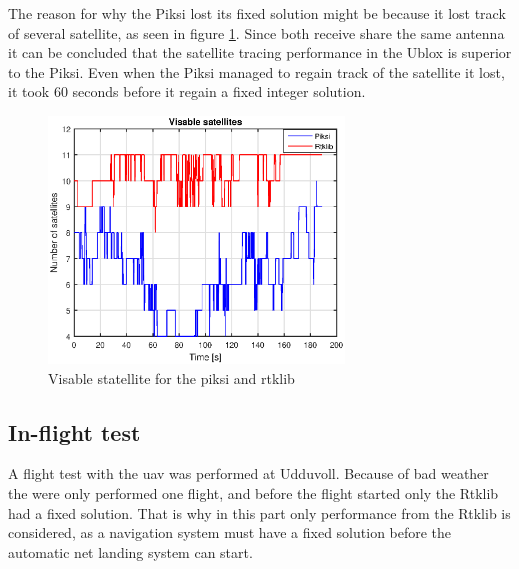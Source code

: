The reason for why the Piksi lost its fixed solution might be because it lost track of several satellite, as seen in figure \ref{figure:numSatWalk2}. Since both receive share the same antenna it can be concluded that the satellite tracing performance in the Ublox is superior to the Piksi.  Even when the Piksi managed to regain track of the satellite it lost, it took 60 seconds before it regain a fixed integer solution. 
\begin{figure}[H]
	\centering
		\includegraphics[width=0.7\textwidth]{figs/plots/numSatWalk2.eps}
		\caption{Visable statellite for the piksi and rtklib}
		\label{figure:numSatWalk2}
\end{figure}
\subsection{In-flight test}
A flight test with the \gls{uav} was performed at Udduvoll. Because of bad weather the were only performed one flight, and before the flight started only the Rtklib had a fixed solution. That is why in this part only performance from the Rtklib is considered, as a navigation system must have a fixed solution before the automatic net landing system can start.


